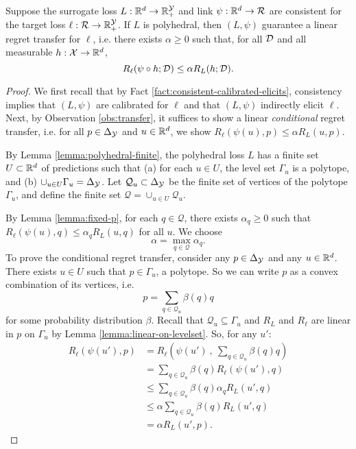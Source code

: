 \begin{theorem*}
  Suppose the surrogate loss $L: \mathbb{R}^d \to \mathbb{R}_+^{\mathcal{Y}}$ and link $\psi: \mathbb{R}^d \to \mathcal{R}$ are consistent for the target loss $\ell: \mathcal{R} \to \mathbb{R}_+^{\mathcal{Y}}$.
  If $L$ is polyhedral, then $(L,\psi)$ guarantee a linear regret transfer for $\ell$, i.e. there exists $\alpha \geq 0$ such that, for all $\mathcal{D}$ and all measurable $h: \mathcal{X} \to \mathbb{R}^d$,
    \[ R_{\ell}(\psi \circ h ; \mathcal{D}) \leq \alpha R_L(h ; \mathcal{D}) . \]
\end{theorem*}
\begin{proof}
  We first recall that by Fact \ref{fact:consistent-calibrated-elicits}, consistency implies that $(L,\psi)$ are calibrated for $\ell$ and that $(L,\psi)$ indirectly elicit $\ell$.
  Next, by Observation \ref{obs:transfer}, it suffices to show a linear \emph{conditional} regret transfer, i.e. for all $p \in \Delta_{\mathcal{Y}}$ and $u \in \mathbb{R}^d$, we show $R_{\ell}(\psi(u),p) \leq \alpha R_L(u,p)$.
  
  By Lemma \ref{lemma:polyhedral-finite}, the polyhedral loss $L$ has a finite set $U \subset \mathbb{R}^d$ of predictions such that (a) for each $u \in U$, the level set $\Gamma_u$ is a polytope, and (b) $\cup_{u \in U} \Gamma_u = \Delta_{\mathcal{Y}}$.
  Let $\mathcal{Q}_u \subset \Delta_{\mathcal{Y}}$ be the finite set of vertices of the polytope $\Gamma_u$, and define the finite set $\mathcal{Q} = \cup_{u \in U} \mathcal{Q}_u$.
  
  By Lemma \ref{lemma:fixed-p}, for each $q \in \mathcal{Q}$, there exists $\alpha_q \geq 0$ such that $R_{\ell}(\psi(u),q) \leq \alpha_q R_L(u,q)$ for all $u$.
  We choose
    \[ \alpha = \max_{q \in \mathcal{Q}} \alpha_q . \]
  To prove the conditional regret transfer, consider any $p \in \Delta_{\mathcal{Y}}$ and any $u \in \mathbb{R}^d$.
  There exists $u \in U$ such that $p \in \Gamma_u$, a polytope.
  So we can write $p$ as a convex combination of its vertices, i.e.
    \[ p = \sum_{q \in \mathcal{Q}_u} \beta(q) q \]
  for some probability distribution $\beta$.
  Recall that $\mathcal{Q}_u \subseteq \Gamma_u$ and $R_L$ and $R_{\ell}$ are linear in $p$ on $\Gamma_u$ by Lemma \ref{lemma:linear-on-levelset}.
  So, for any $u'$:
  \begin{align*}
    R_{\ell}(\psi(u'),p)
    &=    R_{\ell}\left(\psi(u') ~,~ \sum_{q \in \mathcal{Q}_u} \beta(q) q\right)  \\
    &=    \sum_{q \in \mathcal{Q}_u} \beta(q) R_{\ell}(\psi(u'),q)  \\
    &\leq \sum_{q \in \mathcal{Q}_u} \beta(q) \alpha_{q} R_L(u',q)  \\
    &\leq \alpha \sum_{q \in \mathcal{Q}_u} \beta(q) R_L(u',q)  \\
    &=    \alpha R_L(u', p) .
  \end{align*}
\end{proof}




